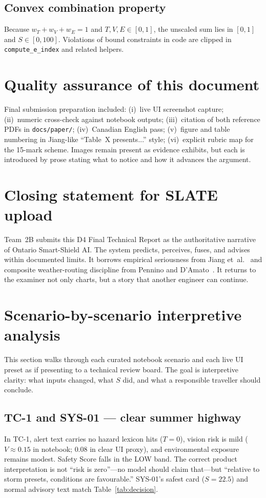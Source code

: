 \documentclass[11pt,a4paper]{article}
\begin{document}
\subsection{Convex combination property}
Because $w_T+w_V+w_E=1$ and $T,V,E\in[0,1]$, the unscaled sum lies in $[0,1]$ and $S\in[0,100]$. Violations of bound constraints in code are clipped in \texttt{compute\_e\_index} and related helpers.

\newpage
\section*{Quality assurance of this document}
Final submission preparation included: (i)~live UI screenshot capture; (ii)~numeric cross-check against notebook outputs; (iii)~citation of both reference PDFs in \texttt{docs/paper/}; (iv)~Canadian English pass; (v)~figure and table numbering in Jiang-like ``Table~X presents...'' style; (vi)~explicit rubric map for the 15-mark scheme. Images remain present as evidence exhibits, but each is introduced by prose stating what to notice and how it advances the argument.

\newpage
\section*{Closing statement for SLATE upload}
Team~2B submits this D4 Final Technical Report as the authoritative narrative of Ontario Smart-Shield AI. The system predicts, perceives, fuses, and advises within documented limits. It borrows empirical seriousness from Jiang et~al.~\citep{jiang2024traffic} and composite weather-routing discipline from Pennino and D'Amato~\citep{pennino2024weather}. It returns to the examiner not only charts, but a story that another engineer can continue.




\newpage
\section*{Scenario-by-scenario interpretive analysis}
\label{sec:scenarios}

This section walks through each curated notebook scenario and each live UI preset as if presenting to a technical review board. The goal is interpretive clarity: what inputs changed, what $S$ did, and what a responsible traveller should conclude.

\subsection{TC-1 and SYS-01 --- clear summer highway}
In TC-1, alert text carries no hazard lexicon hits ($T=0$), vision risk is mild ($V\approx0.15$ in notebook; $0.08$ in clear UI proxy), and environmental exposure remains modest. Safety Score falls in the LOW band. The correct product interpretation is not ``risk is zero''---no model should claim that---but ``relative to storm presets, conditions are favourable.'' SYS-01's safest card ($S=22.5$) and normal advisory text match Table~\ref{tab:decision}.
\end{document}
